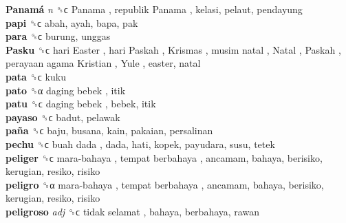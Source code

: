 \textbf{Panamá} \emph{n}  ␝ϲ   Panama ,  republik Panama , kelasi, pelaut, pendayung  \\
\textbf{papi} ␝ϲ  abah, ayah, bapa, pak  \\
\textbf{para} ␝ϲ  burung, unggas  \\
\textbf{Pasku} ␝ϲ   hari Easter ,  hari Paskah ,  Krismas ,  musim natal ,  Natal ,  Paskah ,  perayaan agama Kristian ,  Yule , easter, natal  \\
\textbf{pata} ␝ϲ  kuku  \\
\textbf{pato} ␝α   daging bebek , itik  \\
\textbf{patu} ␝ϲ   daging bebek , bebek, itik  \\
\textbf{payaso} ␝ϲ  badut, pelawak  \\
\textbf{paña} ␝ϲ  baju, busana, kain, pakaian, persalinan  \\
\textbf{pechu} ␝ϲ   buah dada , dada, hati, kopek, payudara, susu, tetek  \\
\textbf{peliger} ␝ϲ   mara-bahaya ,  tempat berbahaya , ancamam, bahaya, berisiko, kerugian, resiko, risiko  \\
\textbf{peligro} ␝α   mara-bahaya ,  tempat berbahaya , ancamam, bahaya, berisiko, kerugian, resiko, risiko  \\
\textbf{peligroso} \emph{adj}  ␝ϲ   tidak selamat , bahaya, berbahaya, rawan  \\
